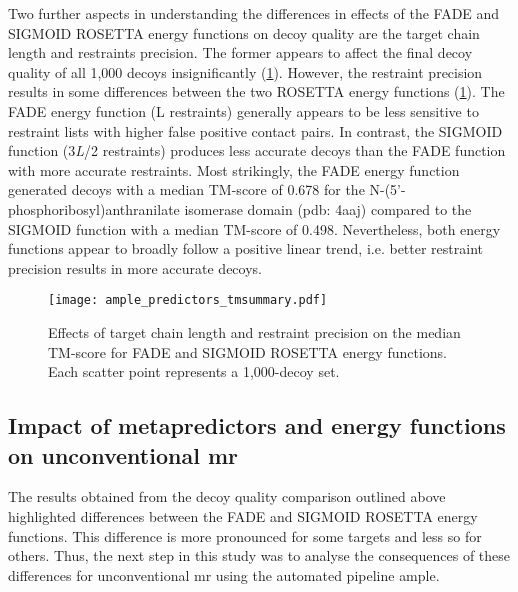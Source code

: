 Two further aspects in understanding the differences in effects of the FADE and SIGMOID ROSETTA energy functions on decoy quality are the target chain length and restraints precision. The former appears to affect the final decoy quality of all 1,000 decoys insignificantly (\cref{fig:ample_predictor_tmsummary}). However, the restraint precision results in some differences between the two ROSETTA energy functions (\cref{fig:ample_predictor_tmsummary}). The FADE energy function (L restraints) generally appears to be less sensitive to restraint lists with higher false positive contact pairs.  In contrast, the SIGMOID function  (3\textit{L}/2 restraints) produces less accurate decoys than the FADE function with more accurate restraints. Most strikingly, the FADE energy function generated decoys with a median TM-score of 0.678 for the N-(5'-phosphoribosyl)anthranilate isomerase domain (\gls{pdb}: 4aaj) compared to the SIGMOID function with a median TM-score of 0.498. Nevertheless, both energy functions appear to broadly follow a positive linear trend, i.e. better restraint precision results in more accurate decoys.

\begin{figure}[H]
    \centering
    \texttt{[image: ample\_predictors\_tmsummary.pdf]}
    \caption{Effects of target chain length and restraint precision on the median TM-score for FADE and SIGMOID ROSETTA energy functions. Each scatter point represents a 1,000-decoy set.}
    \label{fig:ample_predictor_tmsummary}
\end{figure}

\subsection{Impact of metapredictors and energy functions on unconventional \acrlong{mr}}
The results obtained from the decoy quality comparison outlined above highlighted differences between the FADE and SIGMOID ROSETTA energy functions. This difference is more pronounced for some targets and less so for others. Thus, the next step in this study was to analyse the consequences  of these differences for unconventional \gls{mr} using the automated pipeline \gls{ample}.

